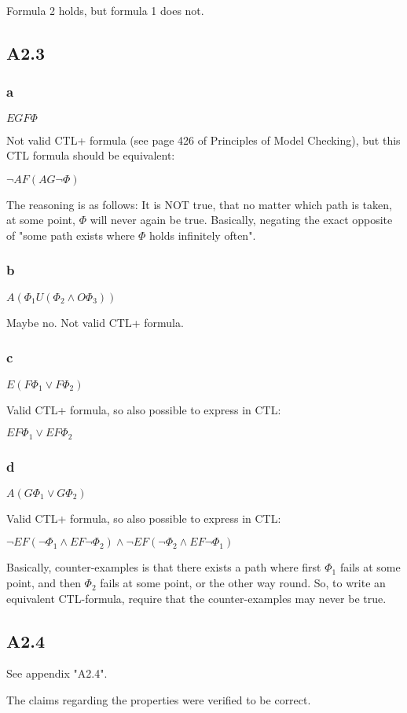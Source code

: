Formula 2 holds, but formula 1 does not.

\subsection{A2.3}

\subsubsection{a}

$EGF \Phi$

Not valid CTL+ formula (see page 426 of Principles of Model Checking),
but this CTL formula should be equivalent:

$\neg AF (AG \neg \Phi)$

The reasoning is as follows:
It is NOT true, that no matter which path is taken,
at some point, $\Phi$ will never again be true.
Basically, negating the exact opposite of "some path exists where
$\Phi$ holds infinitely often".


\subsubsection{b}

$A ( \Phi_1 U ( \Phi_2 \wedge O \Phi_3) )$

Maybe no.
Not valid CTL+ formula.

\subsubsection{c}

$E (F \Phi_1 \vee F \Phi_2)$

Valid CTL+ formula, so also possible to express in CTL:

$EF \Phi_1 \vee EF \Phi_2$

\subsubsection{d}

$A (G \Phi_1 \vee G \Phi_2)$

Valid CTL+ formula, so also possible to express in CTL:

$\neg EF ( \neg \Phi_1 \wedge EF \neg \Phi_2) \wedge
\neg EF ( \neg \Phi_2 \wedge EF \neg \Phi_1)$

Basically, counter-examples is that there exists a path
where first $\Phi_1$ fails at some point, and then $\Phi_2$ fails at some point,
or the other way round.
So, to write an equivalent CTL-formula,
require that the counter-examples may never be true.

\subsection{A2.4}

See appendix "A2.4".

The claims regarding the properties were verified to be correct.

